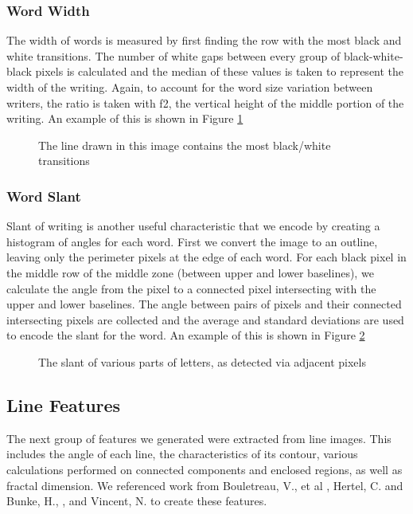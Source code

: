 \documentclass[paper=a4, fontsize=11pt]{scrartcl} %
\numberwithin{equation}{section} %
\numberwithin{figure}{section} %
\numberwithin{table}{section} %
\begin{document}
\subsubsection{Word Width}
The width of words is measured by first finding the row with the most
black and white transitions. The number of white gaps between every
group of black-white-black pixels is calculated and the median of
these values is taken to represent the width of the writing. Again, to
account for the word size variation between writers, the ratio is
taken with f2, the vertical height of the middle portion of the
writing. An example of this is shown in Figure \ref{fig:wordwidth}

\begin{figure}
  \label{fig:wordwidth}
  \caption{The line drawn in this image contains the most black/white
    transitions}
\end{figure}

\subsubsection{Word Slant}
Slant of writing is another useful characteristic that we encode by
creating a histogram of angles for each word. First we convert the
image to an outline, leaving only the perimeter pixels at the edge of
each word. For each black pixel in the middle row of the middle zone
(between upper and lower baselines), we calculate the angle from the
pixel to a connected pixel intersecting with the upper and lower
baselines. The angle between pairs of pixels and their connected
intersecting pixels are collected and the average and standard
deviations are used to encode the slant for the word. An example of
this is shown in Figure \ref{fig:wordslant}

\begin{figure}
  \label{fig:wordslant}
  \caption{The slant of various parts of letters, as detected via
    adjacent pixels}
\end{figure}


\subsection{Line Features}
The next group of features we generated were extracted from line
images. This includes the angle of each line, the characteristics of
its contour, various calculations performed on connected components
and enclosed regions, as well as fractal dimension. We referenced work
from Bouletreau, V., et al \cite{SyntheticParameters}, Hertel, C. and
Bunke, H., \cite{NovelFeatures}, and Vincent,
N. \cite{FractalDimensions} to create these features.
\end{document}
